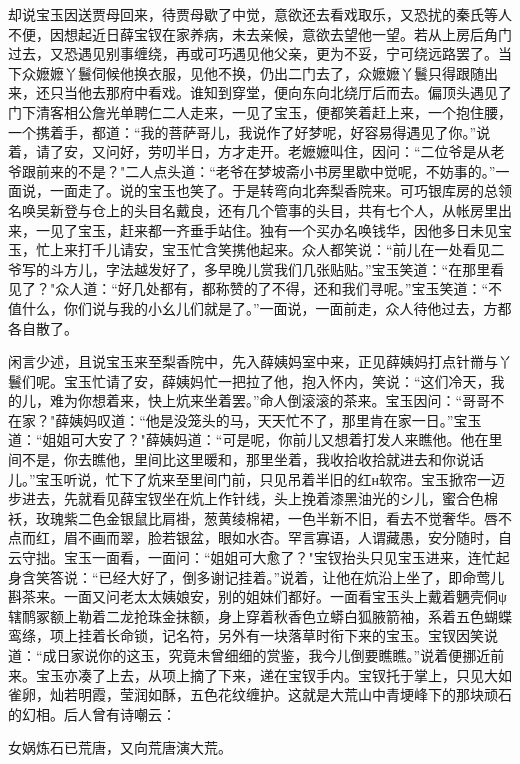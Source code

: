 却说宝玉因送贾母回来，待贾母歇了中觉，意欲还去看戏取乐，又恐扰的秦氏等人不便，因想起近日薛宝钗在家养病，未去亲候，意欲去望他一望。若从上房后角门过去，又恐遇见别事缠绕，再或可巧遇见他父亲，更为不妥，宁可绕远路罢了。当下众嬷嬷丫鬟伺候他换衣服，见他不换，仍出二门去了，众嬷嬷丫鬟只得跟随出来，还只当他去那府中看戏。谁知到穿堂，便向东向北绕厅后而去。偏顶头遇见了门下清客相公詹光单聘仁二人走来，一见了宝玉，便都笑着赶上来，一个抱住腰，一个携着手，都道：“我的菩萨哥儿，我说作了好梦呢，好容易得遇见了你。”说着，请了安，又问好，劳叨半日，方才走开。老嬷嬷叫住，因问：“二位爷是从老爷跟前来的不是？"二人点头道：“老爷在梦坡斋小书房里歇中觉呢，不妨事的。”一面说，一面走了。说的宝玉也笑了。于是转弯向北奔梨香院来。可巧银库房的总领名唤吴新登与仓上的头目名戴良，还有几个管事的头目，共有七个人，从帐房里出来，一见了宝玉，赶来都一齐垂手站住。独有一个买办名唤钱华，因他多日未见宝玉，忙上来打千儿请安，宝玉忙含笑携他起来。众人都笑说：“前儿在一处看见二爷写的斗方儿，字法越发好了，多早晚儿赏我们几张贴贴。”宝玉笑道：“在那里看见了？"众人道：“好几处都有，都称赞的了不得，还和我们寻呢。”宝玉笑道：“不值什么，你们说与我的小幺儿们就是了。”一面说，一面前走，众人待他过去，方都各自散了。

闲言少述，且说宝玉来至梨香院中，先入薛姨妈室中来，正见薛姨妈打点针黹与丫鬟们呢。宝玉忙请了安，薛姨妈忙一把拉了他，抱入怀内，笑说：“这们冷天，我的儿，难为你想着来，快上炕来坐着罢。”命人倒滚滚的茶来。宝玉因问：“哥哥不在家？"薛姨妈叹道：“他是没笼头的马，天天忙不了，那里肯在家一日。”宝玉道：“姐姐可大安了？"薛姨妈道：“可是呢，你前儿又想着打发人来瞧他。他在里间不是，你去瞧他，里间比这里暖和，那里坐着，我收拾收拾就进去和你说话儿。”宝玉听说，忙下了炕来至里间门前，只见吊着半旧的红н软帘。宝玉掀帘一迈步进去，先就看见薛宝钗坐在炕上作针线，头上挽着漆黑油光的シ儿，蜜合色棉袄，玫瑰紫二色金银鼠比肩褂，葱黄绫棉裙，一色半新不旧，看去不觉奢华。唇不点而红，眉不画而翠，脸若银盆，眼如水杏。罕言寡语，人谓藏愚，安分随时，自云守拙。宝玉一面看，一面问：“姐姐可大愈了？"宝钗抬头只见宝玉进来，连忙起身含笑答说：“已经大好了，倒多谢记挂着。”说着，让他在炕沿上坐了，即命莺儿斟茶来。一面又问老太太姨娘安，别的姐妹们都好。一面看宝玉头上戴着魉壳侗ψ辖鸸冢额上勒着二龙抢珠金抹额，身上穿着秋香色立蟒白狐腋箭袖，系着五色蝴蝶鸾绦，项上挂着长命锁，记名符，另外有一块落草时衔下来的宝玉。宝钗因笑说道：“成日家说你的这玉，究竟未曾细细的赏鉴，我今儿倒要瞧瞧。”说着便挪近前来。宝玉亦凑了上去，从项上摘了下来，递在宝钗手内。宝钗托于掌上，只见大如雀卵，灿若明霞，莹润如酥，五色花纹缠护。这就是大荒山中青埂峰下的那块顽石的幻相。后人曾有诗嘲云：

女娲炼石已荒唐，又向荒唐演大荒。

